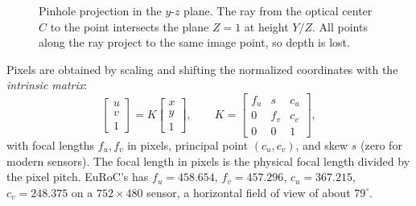 \begin{figure}[t]
\centering
{}
\caption{Pinhole projection in the $y$-$z$ plane. The ray from the optical center $C$ to the point intersects the
plane $Z = 1$ at height $Y/Z$. All points along the ray project to the same image point, so depth is lost.}
\label{fig:pinhole}
\end{figure}

Pixels are obtained by scaling and shifting the normalized coordinates with the \emph{intrinsic matrix}:
\begin{equation}
  \begin{bmatrix} u \\ v \\ 1 \end{bmatrix} = K\begin{bmatrix} x \\ y \\ 1 \end{bmatrix}, \qquad
  K = \begin{bmatrix} f_u & s & c_u \\ 0 & f_v & c_v \\ 0 & 0 & 1 \end{bmatrix},
\end{equation}
with focal lengths $f_u, f_v$ in pixels, principal point $(c_u, c_v)$, and skew $s$ (zero for modern sensors). The focal
length in pixels is the physical focal length divided by the pixel pitch. EuRoC's  has
$f_u = 458.654$, $f_v = 457.296$, $c_u = 367.215$, $c_v = 248.375$ on a $752\times480$ sensor, a horizontal field of view of
about $79^\circ$.

